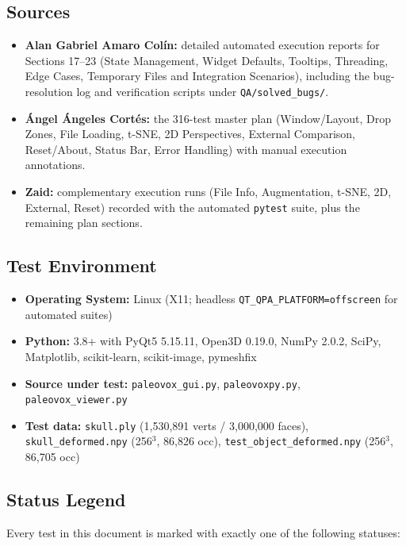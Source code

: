 \documentclass[12pt,a4paper]{article}
\begin{document}
\subsection{Sources}
\begin{itemize}
  \item \textbf{Alan Gabriel Amaro Col\'in:} detailed automated execution reports
        for Sections 17--23 (State Management, Widget Defaults, Tooltips,
        Threading, Edge Cases, Temporary Files and Integration Scenarios),
        including the bug-resolution log and verification scripts under
        \texttt{QA/solved\_bugs/}.
  \item \textbf{\'Angel \'Angeles Cort\'es:} the 316-test master plan
        (Window/Layout, Drop Zones, File Loading, t-SNE, 2D Perspectives,
        External Comparison, Reset/About, Status Bar, Error Handling) with manual
        execution annotations.
  \item \textbf{Zaid:} complementary execution runs (File Info, Augmentation,
        t-SNE, 2D, External, Reset) recorded with the automated \texttt{pytest}
        suite, plus the remaining plan sections.
\end{itemize}

\subsection{Test Environment}
\begin{itemize}
  \item \textbf{Operating System:} Linux (X11; headless \texttt{QT\_QPA\_PLATFORM=offscreen} for automated suites)
  \item \textbf{Python:} 3.8+ with PyQt5 5.15.11, Open3D 0.19.0, NumPy 2.0.2,
        SciPy, Matplotlib, scikit-learn, scikit-image, pymeshfix
  \item \textbf{Source under test:} \texttt{paleovox\_gui.py}, \texttt{paleovoxpy.py},
        \texttt{paleovox\_viewer.py}
  \item \textbf{Test data:} \texttt{skull.ply} (1,530,891 verts / 3,000,000 faces),
        \texttt{skull\_deformed.npy} (256$^3$, 86,826 occ),
        \texttt{test\_object\_deformed.npy} (256$^3$, 86,705 occ)
\end{itemize}

\subsection{Status Legend}
Every test in this document is marked with exactly one of the following statuses:
\end{document}
